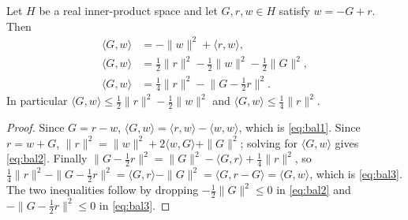 \begin{Lemma}\label{lem:balance}
Let $H$ be a real inner-product space and let $G,r,w\in H$ satisfy $w=-G+r$. Then
\begin{align}
\langle G,w\rangle &= -\|w\|^2+\langle r,w\rangle, \label{eq:bal1}\\
\langle G,w\rangle &= \tfrac12\|r\|^2-\tfrac12\|w\|^2-\tfrac12\|G\|^2, \label{eq:bal2}\\
\langle G,w\rangle &= \tfrac14\|r\|^2-\bigl\|G-\tfrac12 r\bigr\|^2. \label{eq:bal3}
\end{align}
In particular $\langle G,w\rangle\le\tfrac12\|r\|^2-\tfrac12\|w\|^2$ and $\langle G,w\rangle\le\tfrac14\|r\|^2$.
\end{Lemma}
\begin{proof}
Since $G=r-w$, $\langle G,w\rangle=\langle r,w\rangle-\langle w,w\rangle$, which is \eqref{eq:bal1}.
Since $r=w+G$, $\|r\|^2=\|w\|^2+2\langle w,G\rangle+\|G\|^2$; solving for $\langle G,w\rangle$ gives \eqref{eq:bal2}.
Finally $\bigl\|G-\tfrac12 r\bigr\|^2=\|G\|^2-\langle G,r\rangle+\tfrac14\|r\|^2$, so $\tfrac14\|r\|^2-\|G-\tfrac12 r\|^2=\langle G,r\rangle-\|G\|^2=\langle G,r-G\rangle=\langle G,w\rangle$, which is \eqref{eq:bal3}.
The two inequalities follow by dropping $-\tfrac12\|G\|^2\le0$ in \eqref{eq:bal2} and $-\|G-\tfrac12 r\|^2\le0$ in \eqref{eq:bal3}.
\end{proof}

